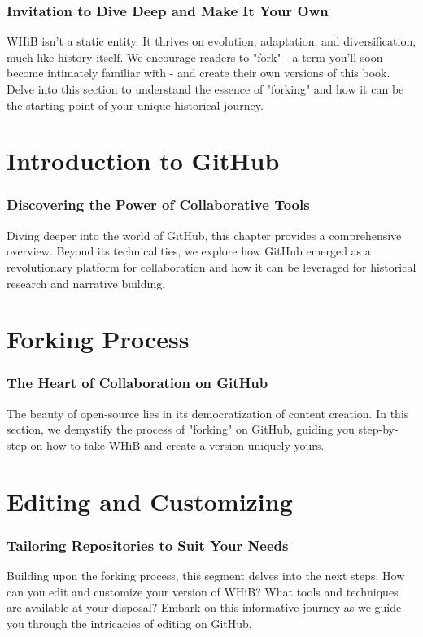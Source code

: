 \documentclass[a4paper,12pt]{book}
\begin{document}
\subsection*{Invitation to Dive Deep and Make It Your Own}
WHiB isn't a static entity. It thrives on evolution, adaptation, and diversification, much like history itself. We encourage readers to "fork" - a term you'll soon become intimately familiar with - and create their own versions of this book. Delve into this section to understand the essence of "forking" and how it can be the starting point of your unique historical journey.

\chapter{Introduction to GitHub}
\subsection*{Discovering the Power of Collaborative Tools}
Diving deeper into the world of GitHub, this chapter provides a comprehensive overview. Beyond its technicalities, we explore how GitHub emerged as a revolutionary platform for collaboration and how it can be leveraged for historical research and narrative building.

\chapter{Forking Process}
\subsection*{The Heart of Collaboration on GitHub}
The beauty of open-source lies in its democratization of content creation. In this section, we demystify the process of "forking" on GitHub, guiding you step-by-step on how to take WHiB and create a version uniquely yours.

\chapter{Editing and Customizing}
\subsection*{Tailoring Repositories to Suit Your Needs}
Building upon the forking process, this segment delves into the next steps. How can you edit and customize your version of WHiB? What tools and techniques are available at your disposal? Embark on this informative journey as we guide you through the intricacies of editing on GitHub.
\end{document}
